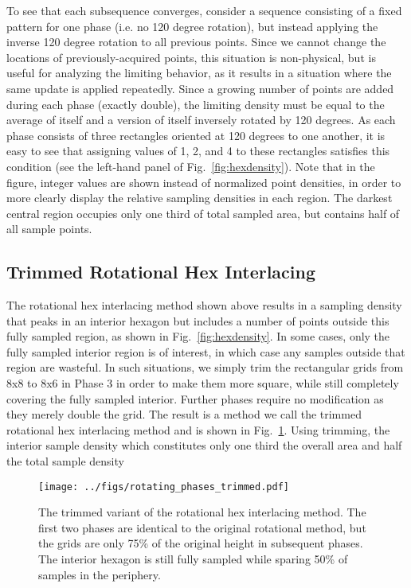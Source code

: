 \documentclass{article}
\newcommand{\reffig}[1]{Fig.~\ref{fig:#1}}
\begin{document}
To see that each subsequence converges, consider a sequence consisting of a
fixed pattern for one phase (i.e. no 120 degree rotation), but instead applying
the inverse 120 degree rotation to all previous points.
%
Since we cannot change the locations of previously-acquired points, this
situation is non-physical, but is useful for analyzing the limiting behavior,
as it results in a situation where the same update is applied repeatedly.
%
Since a growing number of points are added during each phase (exactly double),
the limiting density must be equal to the average of itself and a version of
itself inversely rotated by 120 degrees.
%
As each phase consists of three rectangles oriented at 120 degrees to one
another, it is easy to see that assigning values of 1, 2, and 4 to these
rectangles satisfies this condition (see the left-hand panel of
\reffig{hexdensity}).
%
Note that in the figure, integer values are shown instead of normalized point
densities, in order to more clearly display the relative sampling densities in
each region.
%
The darkest central region occupies only one third of total sampled area, but
contains half of all sample points.
%

\subsection{Trimmed Rotational Hex Interlacing}
\label{sec:trimmed}

The rotational hex interlacing method shown above results in a sampling density that peaks in an interior hexagon but includes a number of points outside this fully sampled region, as shown in \reffig{hexdensity}.
%
In some cases, only the fully sampled interior region is of interest, in which case any samples outside that region are wasteful.
%
In such situations, we simply trim the rectangular grids from 8x8 to 8x6 in Phase 3 in order to make them more square, while still completely covering the fully sampled interior.
%
Further phases require no modification as they merely double the grid.
%
The result is a method we call the trimmed rotational hex interlacing method and is shown in \reffig{trimmedrotatingphases}.
%
Using trimming, the interior sample density which constitutes only one third the overall area and half the total sample density

\begin{figure}[ht]
\centering
\texttt{[image: ../figs/rotating\_phases\_trimmed.pdf]}
\caption{
\label{fig:trimmedrotatingphases} 
The trimmed variant of the rotational hex interlacing method.
%
The first two phases are identical to the original rotational method, but the grids are only 75\% of the original height in subsequent phases.
%
The interior hexagon is still fully sampled while sparing 50\% of samples in the periphery.
}
\end{figure}
\end{document}
